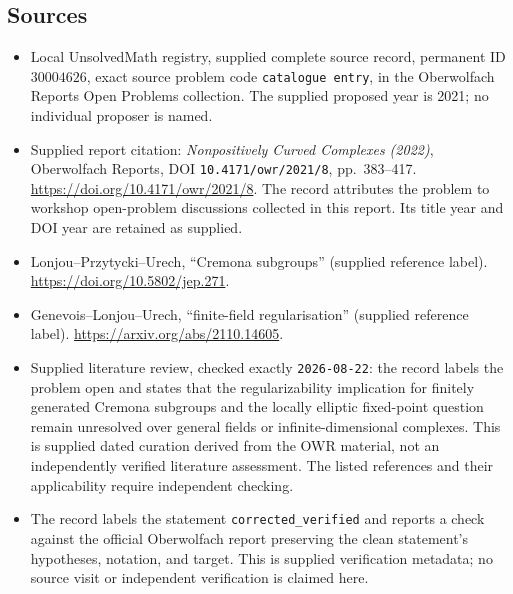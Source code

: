 \documentclass[11pt]{article}
\begin{document}
\subsection{Sources}
\begin{itemize}
\item Local UnsolvedMath registry, supplied complete source record, permanent ID \(30004626\), exact source problem code \texttt{catalogue entry}, in the Oberwolfach Reports Open Problems collection. The supplied proposed year is 2021; no individual proposer is named.
\item Supplied report citation: \emph{Nonpositively Curved Complexes (2022)}, Oberwolfach Reports, DOI \texttt{10.4171/owr/2021/8}, pp.~383--417. \url{https://doi.org/10.4171/owr/2021/8}. The record attributes the problem to workshop open-problem discussions collected in this report. Its title year and DOI year are retained as supplied.
\item Lonjou--Przytycki--Urech, ``Cremona subgroups'' (supplied reference label). \url{https://doi.org/10.5802/jep.271}.
\item Genevois--Lonjou--Urech, ``finite-field regularisation'' (supplied reference label). \url{https://arxiv.org/abs/2110.14605}.
\item Supplied literature review, checked exactly \texttt{2026-08-22}: the record labels the problem open and states that the regularizability implication for finitely generated Cremona subgroups and the locally elliptic fixed-point question remain unresolved over general fields or infinite-dimensional complexes. This is supplied dated curation derived from the OWR material, not an independently verified literature assessment. The listed references and their applicability require independent checking.
\item The record labels the statement \texttt{corrected\_verified} and reports a check against the official Oberwolfach report preserving the clean statement's hypotheses, notation, and target. This is supplied verification metadata; no source visit or independent verification is claimed here.
\end{itemize}
\end{document}
